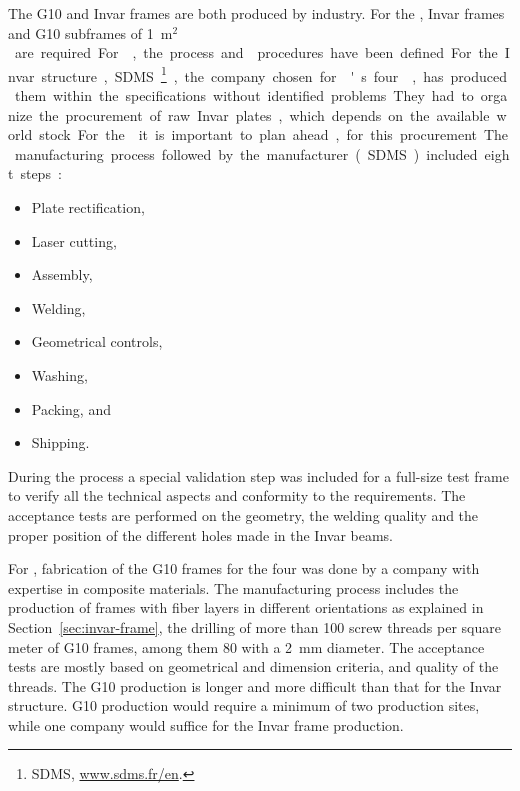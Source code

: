 The G10 and Invar frames are both produced by industry. For the , %
\dptotcrp Invar frames and \dpnumpmtch %
G10 subframes of \SI{1}{m$^2$} are required. %
For , the process and  procedures have been defined.
For the Invar structure, SDMS\footnote{SDMS\texttrademark{}, \url{www.sdms.fr/en}.}, the company chosen for 's four ,  %
has produced them within the specifications without identified problems.
They had to organize the procurement of raw Invar plates, which depends on the available world stock. For the  it is important to plan ahead, %
 for this procurement. 
The manufacturing process followed by the manufacturer (SDMS) included eight steps:\\
\begin{itemize}
\item Plate rectification,
\item  Laser cutting,
\item  Assembly,
\item  Welding,
\item  Geometrical controls,
\item  Washing,
\item  Packing, and
\item  Shipping.
\end{itemize}

During the process a special validation step was included  for a full-size test frame to verify all the technical aspects and conformity to the requirements. 
The acceptance tests are performed on the geometry, the welding quality and the proper position of the different holes made in the Invar beams.

For , fabrication of the G10 frames for the four  was done by a company with expertise in composite materials. The manufacturing process includes the %
production of frames with fiber layers in different orientations as explained in Section~\ref{sec:invar-frame}, the drilling of more than \num{100} screw threads per square meter of G10 frames, among them \num{80} with a \SI{2}{mm} diameter.
The acceptance tests are mostly based on geometrical and dimension criteria, and quality of the threads.  
The G10 production is longer and more difficult than that for the Invar structure. G10 production would require a minimum of two production sites, while one company would suffice for the Invar frame production.


